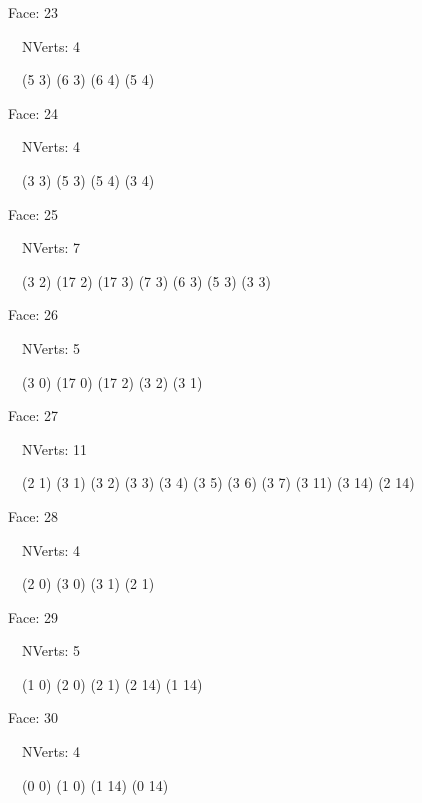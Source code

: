 \documentclass{article}
\begin{document}
{\footnotesize 

Face: 23

\   \    NVerts: 4

 \   \   (5 3) (6 3) (6 4) (5 4)}

{\footnotesize 

Face: 24

\   \    NVerts: 4

 \   \   (3 3) (5 3) (5 4) (3 4)}

{\footnotesize 

Face: 25

\   \    NVerts: 7

 \   \   (3 2) (17 2) (17 3) (7 3) (6 3) (5 3) (3 3)}

{\footnotesize 

Face: 26

\   \    NVerts: 5

 \   \   (3 0) (17 0) (17 2) (3 2) (3 1)}

{\footnotesize 

Face: 27

\   \    NVerts: 11

 \   \   (2 1) (3 1) (3 2) (3 3) (3 4) (3 5) (3 6) (3 7) (3 11) (3 14) (2 14)}

{\footnotesize 

Face: 28

\   \    NVerts: 4

 \   \   (2 0) (3 0) (3 1) (2 1)}

{\footnotesize 

Face: 29

\   \    NVerts: 5

 \   \   (1 0) (2 0) (2 1) (2 14) (1 14)}

{\footnotesize 

Face: 30

\   \    NVerts: 4

 \   \   (0 0) (1 0) (1 14) (0 14)}


 \newpage
\end{document}

